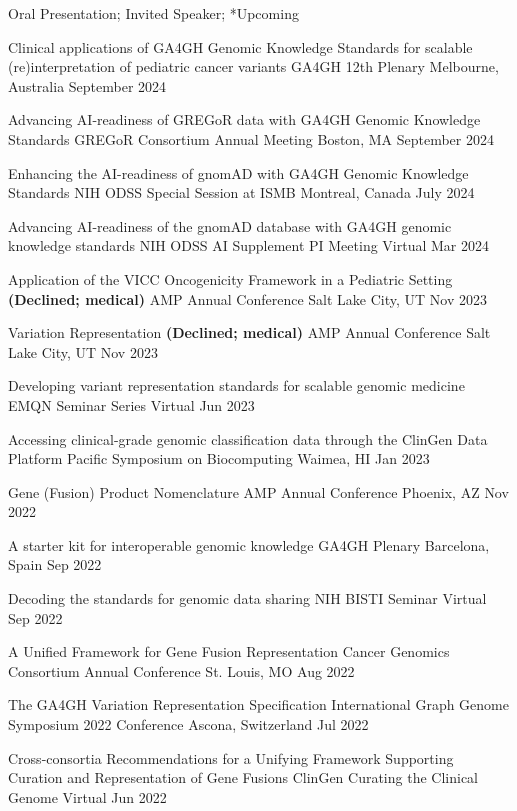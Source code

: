 \textsuperscript{\textdagger}Oral Presentation; \textsuperscript{\textdaggerdbl}Invited Speaker; *Upcoming

\invited
{Clinical applications of GA4GH Genomic Knowledge Standards for scalable (re)interpretation of pediatric cancer variants}
{GA4GH 12th Plenary}
{Melbourne, Australia}
{September 2024}

\invited
{Advancing AI-readiness of GREGoR data with GA4GH Genomic Knowledge Standards}
{GREGoR Consortium Annual Meeting}
{Boston, MA}
{September 2024}

\invited
{Enhancing the AI-readiness of gnomAD with GA4GH Genomic Knowledge Standards}
{NIH ODSS Special Session at ISMB}
{Montreal, Canada}
{July 2024}

\invited
{Advancing AI-readiness of the gnomAD database with GA4GH genomic knowledge standards}
{NIH ODSS AI Supplement PI Meeting}
{Virtual}
{Mar 2024}

\invited
{Application of the VICC Oncogenicity Framework in a Pediatric Setting \textbf{(Declined; medical)}}
{AMP Annual Conference}
{Salt Lake City, UT}
{Nov 2023}

\invited
{Variation Representation \textbf{(Declined; medical)}}
{AMP Annual Conference}
{Salt Lake City, UT}
{Nov 2023}

\invited
{Developing variant representation standards for scalable genomic medicine}
{EMQN Seminar Series}
{Virtual}
{Jun 2023}

\oral
{Accessing clinical-grade genomic classification data through the ClinGen Data Platform}
{Pacific Symposium on Biocomputing}
{Waimea, HI}
{Jan 2023}

\invited
{Gene (Fusion) Product Nomenclature}
{AMP Annual Conference}
{Phoenix, AZ}
{Nov 2022}

\invited
{A starter kit for interoperable genomic knowledge}
{GA4GH Plenary}
{Barcelona, Spain}
{Sep 2022}

\invited
{Decoding the standards for genomic data sharing}
{NIH BISTI Seminar}
{Virtual}
{Sep 2022}

\oral
{A Unified Framework for Gene Fusion Representation}
{Cancer Genomics Consortium Annual Conference}
{St. Louis, MO}
{Aug 2022}

\invited
{The GA4GH Variation Representation Specification}
{International Graph Genome Symposium 2022 Conference}
{Ascona, Switzerland}
{Jul 2022}

\oral
{Cross-consortia Recommendations for a Unifying Framework Supporting Curation and Representation of Gene Fusions}
{ClinGen Curating the Clinical Genome}
{Virtual}
{Jun 2022}

